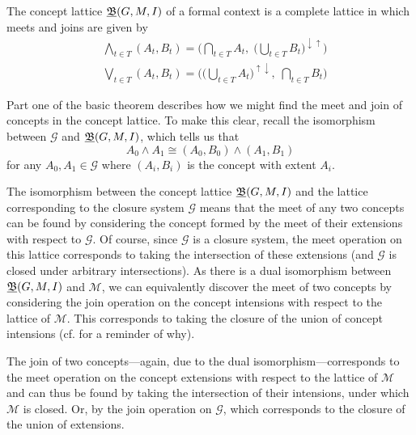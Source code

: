 \begin{theorem}
  \label{theorem:basic-theorem-part1} The concept lattice $\underline{{\mathfrak B}} (G,M,\mathrel{I})$ of a formal context is a complete lattice in which meets and joins are given
  by
  \begin{align*}
     & \underset{t \in T}\bigwedge (A_{t}, B_{t}) = \Big( \underset{t \in T}\bigcap A_{t}, \; \big(\underset{t \in T}\bigcup B_{t}\big)^{\downarrow \uparrow}\Big) \\
     & \underset{t \in T}\bigvee (A_{t}, B_{t}) = \Big( \big(\underset{t \in T}\bigcup A_{t}\big)^{\uparrow \downarrow},\; \underset{t \in T}\bigcap B_{t}\Big)
  \end{align*}
\end{theorem}

Part one of the basic theorem describes how we might find the meet and join of concepts in the concept lattice. To make this clear, recall the
isomorphism between $\mathcal{G}$ and $\underline{{\mathfrak B}} (G,M,\mathrel{I})$, which tells us that
\[
  A_{0}\wedge A_{1}\cong (A_{0},B_{0}) \wedge (A_{1},B_{1})
\]
for any $A_{0},A_{1}\in \mathcal{G}$ where $(A_{i},B_{i})$ is the concept with extent $A_{i}$.

The isomorphism between the concept lattice $\underline{{\mathfrak B}} (G,M,\mathrel{I})$ and the lattice corresponding to the closure system $\mathcal{G}$ means that the meet
of any two concepts can be found by considering the concept formed by the meet of their extensions with respect to $\mathcal{G}$. Of course,
since $\mathcal{G}$ is a closure system, the meet operation on this lattice corresponds to taking the intersection of these extensions (and
$\mathcal{G}$ is closed under arbitrary intersections). As there is a dual isomorphism between $\underline{{\mathfrak B}} (G,M,\mathrel{I})$ and $\mathcal{M}$, we can equivalently
discover the meet of two concepts by considering the join operation on the concept intensions with respect to the lattice of $\mathcal{M}$.
This corresponds to taking the closure of the union of concept intensions (cf.  for a reminder of why).

The join of two concepts---again, due to the dual isomorphism---corresponds to the meet operation on the concept extensions with respect to
the lattice of $\mathcal{M}$ and can thus be found by taking the intersection of their intensions, under which $\mathcal{M}$ is closed. Or, by
the join operation on $\mathcal{G}$, which corresponds to the closure of the union of extensions.

